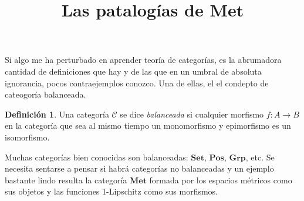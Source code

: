 \documentclass[letter,10pt,notitlepage]{article}
\title{Las patalogías de \( \mathbf{Met}\)}
\date{}
\theoremstyle{definition}
\newtheorem*{definition}{Definición}
\theoremstyle{remark}
\begin{document}
\maketitle
Si algo me ha perturbado en aprender teoría de categorías, es 
la abrumadora cantidad de definiciones que hay y de las que
en un umbral de absoluta ignorancia, pocos contraejemplos
conozco. Una de ellas, el el condepto de cateogoría balanceada.

\begin{definition}
  Una categoría \( \mathcal{C}\) se dice \emph{balanceada}
  si cualquier morfismo \( f \colon A \to B\) en la categoría
  que sea al mismo tiempo un monomorfismo y epimorfismo
  es un isomorfismo.
\end{definition}

Muchas categorías bien conocidas son balanceadas: \( \mathbf{Set}\),
\( \mathbf{Pos}\), \( \mathbf{Grp}\), etc. Se necesita sentarse
a pensar si habrá categorías no balanceadas y un ejemplo bastante
lindo resulta la categoría \( \mathbf{Met}\) formada por
los espacios métricos como sus objetos y las funciones
1-Lipschitz como sus morfismos.
\end{document}
